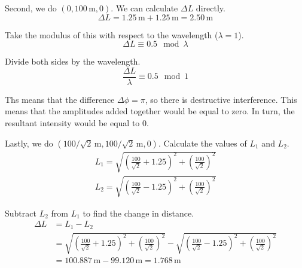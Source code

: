 \documentclass[12pt]{article}
\begin{document}
                Second, we do $(0, 100\,\unit{\meter}, 0)$. 
                We can calculate $\Delta L$ directly.
                \begin{equation}
                    \Delta L = 1.25\,\unit{\meter} + 1.25\,\unit{\meter} = 2.50\,\unit{\meter}
                \end{equation}

                Take the modulus of this with respect to the wavelength ($\lambda = 1$).
                \begin{equation}
                    \Delta L \equiv 0.5 \mod \lambda
                \end{equation}

                Divide both sides by the wavelength.
                \begin{equation}
                    \frac{\Delta L}{\lambda} \equiv 0.5 \mod 1
                \end{equation}

                Ths means that the difference $\Delta \phi = \pi$, so there is destructive interference.
                This means that the amplitudes added together would be equal to zero.
                In turn, the resultant intensity would be equal to 0.

                Lastly, we do $(100/\sqrt{2}\,\unit{\meter}, 100/\sqrt{2}\,\unit{\meter}, 0)$. 
                Calculate the values of $L_1$ and $L_2$.
                \begin{gather}
                    L_1 = \sqrt{\left( \frac{100}{\sqrt{2}} + 1.25 \right)^2 + \left( \frac{100}{\sqrt{2}} \right)^2}\\
                    L_2 = \sqrt{\left( \frac{100}{\sqrt{2}} - 1.25 \right)^2 + \left( \frac{100}{\sqrt{2}} \right)^2}
                \end{gather}

                Subtract $L_2$ from $L_1$ to find the change in distance.
                \begin{align}
                    \Delta L    &=  L_1 - L_2\\
                        &=  \sqrt{\left( \frac{100}{\sqrt{2}} + 1.25 \right)^2 + \left( \frac{100}{\sqrt{2}} \right)^2} - \sqrt{\left( \frac{100}{\sqrt{2}} - 1.25 \right)^2 + \left( \frac{100}{\sqrt{2}} \right)^2}\\
                        &=  100.887\,\unit{\meter} - 99.120\,\unit{\meter}
                        =   1.768\,\unit{\meter}
                \end{align}
\end{document}
